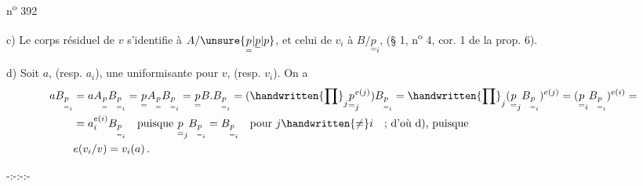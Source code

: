 \hfill n\textsuperscript{o} 392

c) Le corps résiduel de $v$ s'identifie à $A/\unsure{\underset{=}{p}|\underline{p}|p}$, et celui de $v_i$ à $B/\underset{=}{p}_i$, (§ 1, n\textsuperscript{o} 4, cor. 1 de la prop. 6).

d) Soit $a$, (resp. $a_i$), une uniformisante pour $v$, (resp. $v_i$). On a
\[
\begin{aligned}
aB_{\underset{=}{p}_i}&=aA_{\underset{=}{p}}B_{\underset{=}{p}_i}
=\underset{=}{p}A_{\underset{=}{p}}B_{\underset{=}{p}_i}
=\underset{=}{p}B.B_{\underset{=}{p}_i}
=(\handwritten{\prod}_{j}\underset{=}{p}_j^{e(j)})B_{\underset{=}{p}_i}
=\handwritten{\prod}_{j}(\underset{=}{p}_j B_{\underset{=}{p}_i})^{e(j)}
=(\underset{=}{p}_i B_{\underset{=}{p}_i})^{e(i)}=\\
&=a_i^{e(i)}B_{\underset{=}{p}_i}\quad\text{puisque }\underset{=}{p}_jB_{\underset{=}{p}_i}=B_{\underset{=}{p}_i}\quad\text{pour }j\handwritten{\ne}i\quad\text{; d'où d), puisque}\\
&e(v_i/v)=v_i(a)\,.
\end{aligned}
\]

\begin{center}-:-:-:-\end{center}
